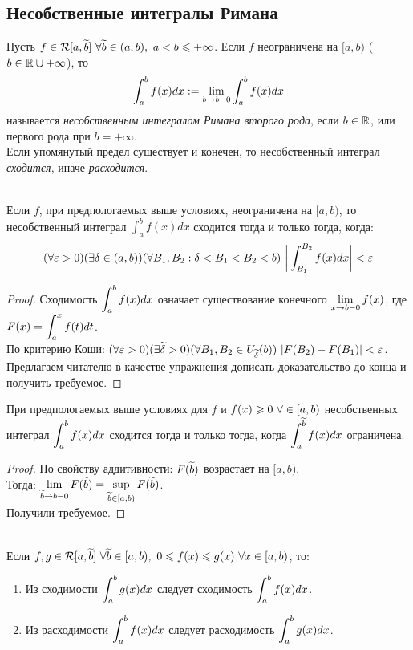 \subsection{Несобственные интегралы Римана}
\begin{definition}
	Пусть $f\in\mc R[a,\t b]\ \fa\t b\in(a,b),\ a<b\le+\infty$. Если $f$ неограничена на $[a,b)$ ($b\in\mathbb{R}\cup+\infty$), то 
	\[\displaystyle\int_a^bf(x)dx:=\lim_{b\ra b-0}\int_a^bf(x)dx\] 
	называется \textit{несобственным интегралом Римана второго рода}, если $b\in\mathbb{R}$, или первого рода при $b=+\infty$. \\
	Если упомянутый предел существует и конечен, то несобственный интеграл \textit{сходится}, иначе \textit{расходится}.
\end{definition}
\begin{theorem}\label{11_th1}\\
	Если $f$, при предпологаемых выше условиях, неограничена на $[a,b)$, то несобственный интеграл $\displaystyle\int_a^bf(x)dx$ сходится тогда и только тогда, когда:
	\[(\fa\eps>0)(\ex\delta\in(a,b))(\fa B_1,B_2:\delta<B_1<B_2<b)\ \bigg|\int_{B_1}^{B_2}f(x)dx\bigg|<\eps\]
\end{theorem}
\begin{proof}
	Сходимость $\displaystyle\int_a^bf(x)dx$ означает существование конечного $\ds\lim_{x\ra b-0}f(x)$, где $\displaystyle F(x)=\int_a^xf(t)dt$.\\
	По критерию Коши: $\displaystyle(\forall\varepsilon>0)(\exists\widetilde\delta>0)(\forall B_1,B_2\in U_{\widetilde\delta}(b))\ |F(B_2)-F(B_1)|<\varepsilon$.
	Предлагаем читателю в качестве упражнения дописать доказательство до конца и получить требуемое.
\end{proof}
\begin{lemma}\label{11_le1}
	При предпологаемых выше условиях для $f$ и $f(x)\geqslant0\ \forall\in[a,b)$ несобственных интеграл $\displaystyle\int_a^bf(x)dx$ сходится тогда и только тогда, когда $\displaystyle\int_a^{\widetilde b}f(x)dx$ ограничена.
\end{lemma}
\begin{proof}
	По свойству аддитивности: $F(\widetilde b)$ возрастает на $[a,b)$.\\
	Тогда: $\ds\lim_{\t b\ra b-0}F(\t b)=\sup_{\t b\in[a,b)}F(\t b)$.\\
	Получили требуемое.
\end{proof}
\begin{theorem}\label{11_th2}\\
	Если $f,g\in\mc R[a,\t b]\ \fa\t b\in[a,b),\ 0\le f(x)\le g(x)\ \fa x\in[a,b)$, то:
	\begin{enumerate}
		\item Из сходимости $\displaystyle\int_a^bg(x)dx$ следует сходимость $\displaystyle\int_a^bf(x)dx$.\\
		\item Из расходимости $\displaystyle\int_a^bf(x)dx$ следует расходимость $\displaystyle\int_a^bg(x)dx$.
	\end{enumerate}
\end{theorem}
